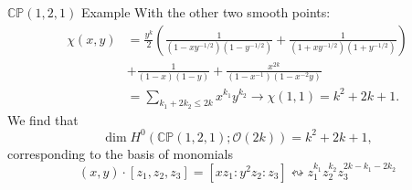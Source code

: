 \documentclass[aspectratio=169,xcolor=dvipsnames]{beamer}
\newcommand{\CC}{\mathbb{C}}
\newcommand{\PP}{\mathbb{P}}
\newcommand{\mc}[1]{\mathcal{#1}}
\begin{document}
\begin{frame}{$\CC\PP(1,2,1)$ Example}
    With the other two smooth points:
    \begin{align*}
        \chi(x,y) &= \frac{y^{k}}{2}\left( \frac{1}{(1 - xy^{-1/2})(1 - y^{-1/2})} + \frac{1}{(1 + xy^{-1/2})(1 + y^{-1/2})} \right) \\
        &+ \frac{1}{(1-x)(1-y)} + \frac{x^{2k}}{(1-x^{-1})(1 - x^{-2}y) } \\
        &= \sum_{k_{1} + 2k_{2} \leq 2k} x^{k_{1}}y^{k_{2}} \longrightarrow \chi(1,1) = k^{2} + 2k + 1.
    \end{align*}
    We find that
    \[
        \dim H^{0}(\CC\PP(1,2,1) ; \mc{O}(2k)) = k^{2} + 2k + 1,
    \]
    corresponding to the basis of monomials
    \[
        (x,y) \cdot [z_{1}, z_{2}, z_{3}] = [xz_{1} : y^{2}z_{2}:z_{3}]  \leftrightsquigarrow z_{1}^{k_{1}}z_{2}^{k_{2}}z_{3}^{2k - k_{1} - 2k_{2}}
    \]
\end{frame}

\end{document}
